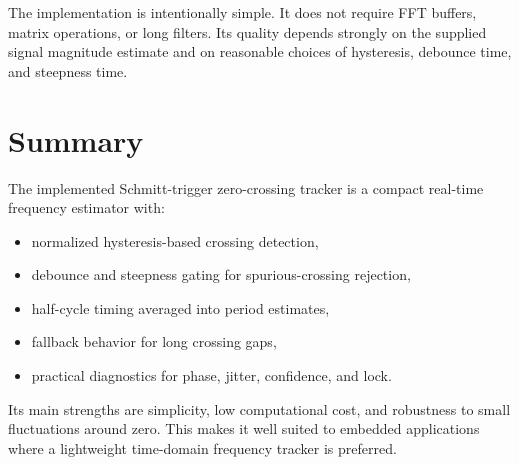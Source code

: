 \documentclass[conference]{IEEEtran}
\begin{document}
    The implementation is intentionally simple. It does not require FFT buffers,
    matrix operations, or long filters. Its quality depends strongly on the
    supplied signal magnitude estimate and on reasonable choices of hysteresis,
    debounce time, and steepness time.

    \section{Summary}

    The implemented Schmitt-trigger zero-crossing tracker is a compact real-time
    frequency estimator with:
    \begin{itemize}[leftmargin=1.4em]
        \item normalized hysteresis-based crossing detection,
        \item debounce and steepness gating for spurious-crossing rejection,
        \item half-cycle timing averaged into period estimates,
        \item fallback behavior for long crossing gaps,
        \item practical diagnostics for phase, jitter, confidence, and lock.
    \end{itemize}

    Its main strengths are simplicity, low computational cost, and robustness to
    small fluctuations around zero. This makes it well suited to embedded
    applications where a lightweight time-domain frequency tracker is preferred.
\end{document}
